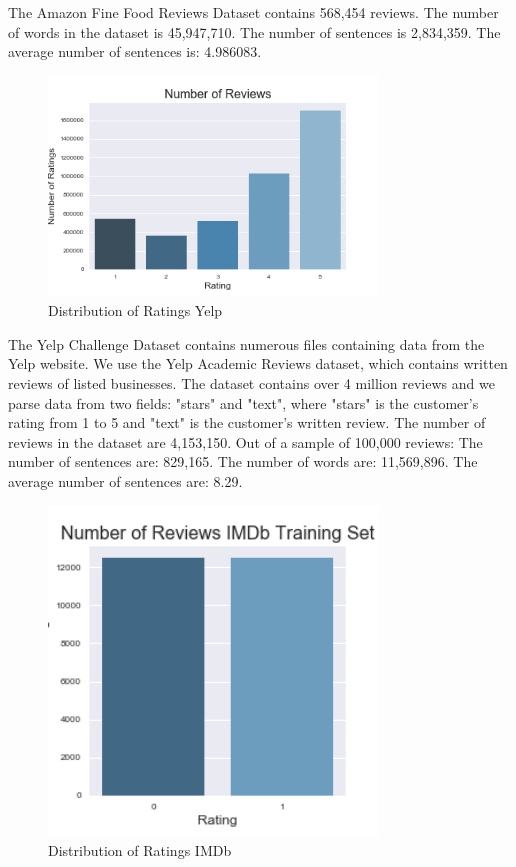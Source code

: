 \documentclass[conference]{IEEEtran}
\begin{document}
The Amazon Fine Food Reviews Dataset contains 568,454 reviews. The number of words in the dataset is 45,947,710. The number of sentences is 2,834,359. The average number of sentences is: 4.986083. 

\begin{figure}[ht!] %
\centering
\includegraphics[width=3.45in]{yelp.png}
\caption{ Distribution of Ratings Yelp}
\label{picture}
\end{figure}

The Yelp Challenge Dataset contains numerous files containing data from the Yelp website. We use the Yelp Academic Reviews dataset, which contains written reviews of listed businesses. The dataset contains over 4 million reviews and we parse data from two fields: "stars" and "text", where "stars" is the customer's rating from 1 to 5 and "text" is the customer's written review. The number of reviews in the dataset are 4,153,150. Out of a sample of 100,000 reviews: The number of sentences are: 829,165. The number of words are: 11,569,896. The average number of sentences are: 8.29.

\begin{figure}[ht!] %
\centering
\includegraphics[width=3.45in]{imdb.png}
\caption{ Distribution of Ratings IMDb}
\label{picture}
\end{figure}
\end{document}
